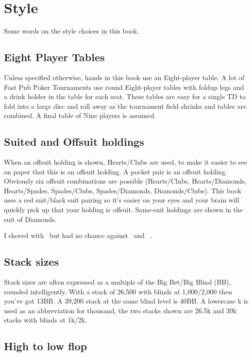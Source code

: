 \chapter{Style}


Some words on the style choices in this book.

\section*{Eight Player Tables}

Unless specified otherwise, hands in this book use an
Eight-player table. A lot of Fast Pub Poker Tournaments use
round Eight-player tables with foldup legs and a drink holder
in the table for each seat. These tables are easy for a single TD
to fold into a large disc and roll away as the tournament
field shrinks and tables are combined. A final table of Nine players
is assumed.

\section*{Suited and Offsuit holdings}

When an offsuit holding is shown, Hearts/Clubs are used, to make
it easier to see on paper that this is an offsuit holding. A pocket
pair is an offsuit holding. Obviously six offsuit combinations are
possible (Hearts/Clubs, Hearts/Diamonds, Hearts/Spades, Spades/Clubs,
Spades/Diamonds, Diamonds/Clubs). This book uses a red suit/black suit
pairing so it's easier on your eyes and your brain will quickly pick
up that your holding is offsuit. Same-suit holdings are shown in the
suit of Diamonds.

I shoved with \Ah\tenc\ but had no chance against \Ad\Kd\ and \Jh\Jc\ .

\section*{Stack sizes}

Stack sizes are often expressed as a multiple of the Big Bet/Big Blind
(BB), rounded intelligently. With a stack of 26,500 with blinds at
1,000/2,000 then you've got 13BB. A 39,200 stack at the same blind
level is 40BB. A lowercase k is used as an abbreviation for thousand,
the two stacks shown are 26.5k and 39k stacks with blinds at 1k/2k.

\section*{High to low flop}

